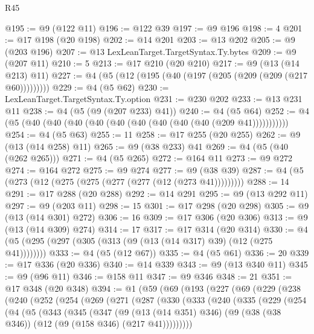 \begin{lexlean}{R45}
\begin{coremodule}
{{{{{{{{{{{{{{{{{{{{{{{{{{{{{{{{{{{{{{{{{{{{{{{{{{{{{{{{{{{{{{{{{{{{{{{{{{{{{{{{{{{{{{{{{{{@195 := @9 (@122 @11)
@196 := @122 @39
@197 := @9 @196
@198 := 4
@201 := @17 @198 (@20 @198)
@202 := @14 @201
@203 := @13 @202
@205 := @9 (@203 @196)
@207 := @13 LexLeanTarget.TargetSyntax.Ty.bytes
@209 := @9 (@207 @11)
@210 := 5
@213 := @17 @210 (@20 @210)
@217 := @9 (@13 (@14 @213) @11)
@227 := @4 (@5 (@12 (@195 (@40 (@197 (@205 (@209 (@209 (@217 @60)))))))))
@229 := @4 (@5 @62)
@230 := LexLeanTarget.TargetSyntax.Ty.option
@231 := @230 @202
@233 := @13 @231 @11
@238 := @4 (@5 (@9 (@207 @233) @41))
@240 := @4 (@5 @64)
@252 := @4 (@5 (@40 (@40 (@40 (@40 (@40 (@40 (@40 (@40 (@40 (@209 @41)))))))))))
@254 := @4 (@5 @63)
@255 := 11
@258 := @17 @255 (@20 @255)
@262 := @9 (@13 (@14 @258) @11)
@265 := @9 (@38 @233) @41
@269 := @4 (@5 (@40 (@262 @265)))
@271 := @4 (@5 @265)
@272 := @164 @11
@273 := @9 @272
@274 := @164 @272
@275 := @9 @274
@277 := @9 (@38 @39)
@287 := @4 (@5 (@273 (@12 (@275 (@275 (@277 (@277 (@12 (@273 @41)))))))))
@288 := 14
@291 := @17 @288 (@20 @288)
@292 := @14 @291
@295 := @9 (@13 @292 @11)
@297 := @9 (@203 @11)
@298 := 15
@301 := @17 @298 (@20 @298)
@305 := @9 (@13 (@14 @301) @272)
@306 := 16
@309 := @17 @306 (@20 @306)
@313 := @9 (@13 (@14 @309) @274)
@314 := 17
@317 := @17 @314 (@20 @314)
@330 := @4 (@5 (@295 (@297 (@305 (@313 (@9 (@13 (@14 @317) @39) (@12 (@275 @41))))))))
@333 := @4 (@5 (@12 @67))
@335 := @4 (@5 @61)
@336 := 20
@339 := @17 @336 (@20 @336)
@340 := @14 @339
@343 := @9 (@13 @340 @11)
@345 := @9 (@96 @11)
@346 := @158 @11
@347 := @9 @346
@348 := 21
@351 := @17 @348 (@20 @348)
@394 := @1
    (@59
      (@69
        (@193
          (@227
            (@69
              (@229
                (@238
                  (@240
                    (@252
                      (@254
                        (@269
                          (@271
                            (@287
                              (@330
                                (@333
                                  (@240
                                    (@335
                                      (@229
                                        (@254
                                          (@4
                                            (@5
                                              (@343
                                                (@345
                                                  (@347
                                                    (@9
                                                      (@13 (@14 @351) @346)
                                                      (@9
                                                        (@38 (@38 @346))
                                                        (@12 (@9 (@158 @346) (@217 @41)))))))))
}}}}}}}}}}}}}}}}}}}}}}}}}}}}}}}}}}}}}}}}}}}}}}}}}}}}}}}}}}}}}}}}}}}}}}}}}}}}}}}}}}}}}}}}}}}
\end{coremodule}
\end{lexlean}
